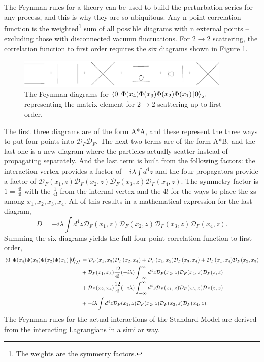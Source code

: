 The Feynman rules for a theory can be used to build the perturbation series for any process, and this is why they are so ubiquitous. Any n-point correlation function is the weighted\footnote{The weights are the symmetry factors.} sum of all possible diagrams with n external points -- excluding those with disconnected vacuum fluctuations. For $2 \rightarrow 2$ scattering, the correlation function to first order requires the six diagrams shown in Figure \ref{fig:feyn2-2}. 
\begin{figure}[h!]
  \centering
  \includegraphics[width=4in]{images/phi4_2-2_scattering.pdf}
  \caption
   {The Feynman diagrams for $\bra{0}\Phi(x_4)\Phi(x_3)\Phi(x_2)\Phi(x_1)\ket{0}_{\lambda^1}$ representing the matrix element for $2\rightarrow 2$ scattering up to first order.}
  \label{fig:feyn2-2}
\end{figure}
The first three diagrams are of the form A*A, and these represent the three ways to put four points into $\mathcal{D}_F\mathcal{D}_F$. The next two terms are of the form A*B, and the last one is a new diagram where the particles actually scatter instead of propagating separately. And the last term is built from the following factors: the interaction vertex provides a factor of $-i\lambda\int d^4z$ and the four propagators provide a factor of $\mathcal{D}_F(x_1,z)\mathcal{D}_F(x_2,z)\mathcal{D}_F(x_3,z)\mathcal{D}_F(x_4,z)$. The symmetry factor is $1 = \frac{4!}{4!}$ with the $\frac{1}{4!}$ from the internal vertex and the 4! for the ways to place the zs among $x_1, x_2, x_3, x_4$. All of this results in a mathematical expression for the last diagram, 
\begin{equation}
D = -i\lambda\int d^4z\mathcal{D}_F(x_1,z)\mathcal{D}_F(x_2,z)\mathcal{D}_F(x_3,z)\mathcal{D}_F(x_4,z).
\end{equation}
Summing the six diagrams yields the full four point correlation function to first order,
\begin{equation}
\begin{split}
\bra{0}\Phi(x_4)\Phi(x_3)\Phi(x_2)\Phi(x_1)\ket{0}_{\lambda^1} &= \mathcal{D}_F(x_1,x_3)\mathcal{D}_F(x_2,x_4) + \mathcal{D}_F(x_1,x_2)\mathcal{D}_F(x_3,x_4) 
                                                                   + \mathcal{D}_F(x_1,x_4)\mathcal{D}_F(x_2,x_3) \\ 
 &+ \mathcal{D}_F(x_1,x_3)\frac{12}{4!}(-i\lambda)\int_{-\infty}^{\infty} d^4z \mathcal{D}_F(x_2,z) \mathcal{D}_F(x_4,z) \mathcal{D}_F(z,z) \\
 &+ \mathcal{D}_F(x_2,x_4)\frac{12}{4!}(-i\lambda)\int_{-\infty}^{\infty} d^4z \mathcal{D}_F(x_1,z) \mathcal{D}_F(x_3,z) \mathcal{D}_F(z,z) \\
 &+ -i\lambda\int d^4z\mathcal{D}_F(x_1,z)\mathcal{D}_F(x_2,z)\mathcal{D}_F(x_3,z)\mathcal{D}_F(x_4,z).
\end{split}
\end{equation}
The Feynman rules for the actual interactions of the Standard Model are derived from the interacting Lagrangians in a similar way. 


